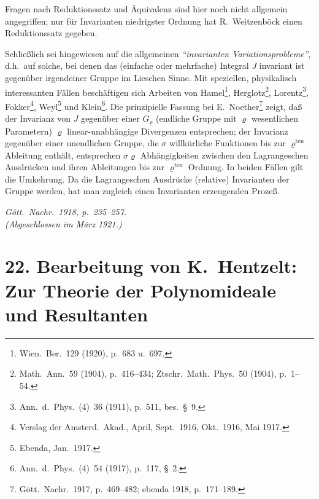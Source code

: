 \documentclass[fontsize=10pt,paper=a5,pagesize,headings=small]{scrbook}
\theoremstyle{plain}
\begin{document}
\newpage
\setcounter{page}{422}

Fragen nach Reduktionssatz und Äquivalenz sind hier noch nicht allgemein
angegriffen; nur für Invarianten niedrigster Ordnung hat R.~Weitzenböck
einen Reduktionssatz gegeben.

Schließlich sei hingewiesen auf die allgemeinen \textit{``invarianten Variationsprobleme''},
d.h.~auf solche, bei denen das (einfache oder mehrfache) Integral $J$ invariant ist
gegenüber irgendeiner Gruppe im Lieschen Sinne. Mit speziellen, physikalisch
interessanten Fällen beschäftigen sich Arbeiten von Hamel\footnote{Wien.\ Ber.\ 129
(1920), p.~683 u.~697.}, Herglotz\footnote{Math.\ Ann.\ 59 (1904), p.~416--434;
Ztschr.\ Math.\ Phys.\ 50 (1904), p.~1--54.}, Lorentz\footnote{Ann.\ d.\ Phys.\ (4)~36
(1911), p.~511, bes.\ \S~9.}, Fokker\footnote{Verslag der Amsterd.\ Akad.,
April, Sept.\ 1916, Okt.\ 1916, Mai 1917.}, Weyl\footnote{Ebenda, Jan.\ 1917.}
und Klein\footnote{Ann.\ d.\ Phys.\ (4)~54 (1917), p.~117, \S~2.}. Die
prinzipielle Fassung bei E.~Noether\footnote{Gött.\ Nachr.\ 1917, p.~469--482;
ebenda 1918, p.~171--189.} zeigt, daß der Invarianz von $J$ gegenüber einer
$G_\varrho$ (endliche Gruppe mit $\varrho$ wesentlichen Parametern) $\varrho$ linear-unabhängige
Divergenzen entsprechen; der Invarianz gegenüber einer unendlichen Gruppe,
die $\sigma$ willkürliche Funktionen bis zur $\varrho^{\text{ten}}$ Ableitung enthält, entsprechen
$\sigma\varrho$ Abhängigkeiten zwischen den Lagrangeschen Ausdrücken und ihren
Ableitungen bis zur $\varrho^{\text{ten}}$ Ordnung. In beiden Fällen gilt die Umkehrung.
Da die Lagrangeschen Ausdrücke (relative) Invarianten der Gruppe werden, hat
man zugleich einen Invarianten erzeugenden Prozeß.

\begin{flushright}
\textit{Gött.\ Nachr.\ 1918, p.~235--257.}\\[4pt]
\textit{(Abgeschlossen im März 1921.)}
\end{flushright}

\newpage

\section*{22. Bearbeitung von K.~Hentzelt:\\Zur Theorie der Polynomideale und Resultanten\footnotemark[0]}
\end{document}
